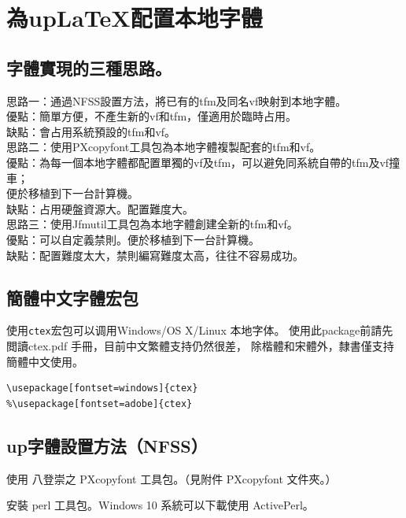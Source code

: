 \clearpage

\section{為up{\LaTeX}配置本地字體}

\subsection{字體實現的三種思路。}
\par\noindent
思路一：通過NFSS設置方法，將已有的tfm及同名vf映射到本地字體。\\
優點：簡單方便，不產生新的vf和tfm，僅適用於臨時占用。\\
缺點：會占用系統預設的tfm和vf。\\[5mm]
思路二：使用PXcopyfont工具包為本地字體複製配套的tfm和vf。\\
優點：為每一個本地字體都配置單獨的vf及tfm，可以避免同系統自帶的tfm及vf撞車；\\
\hspace{3zw}便於移植到下一台計算機。\\
缺點：占用硬盤資源大。配置難度大。\\[5mm]
思路三：使用Jfmutil工具包為本地字體創建全新的tfm和vf。\\
優點：可以自定義禁則。便於移植到下一台計算機。\\
缺點：配置難度太大，禁則編寫難度太高，往往不容易成功。


\subsection{簡體中文字體宏包}
\par
使用\verb+ctex+宏包可以调用Windows/OS X/Linux 本地字体。
使用此package前請先閲讀ctex.pdf 手冊，目前中文繁體支持仍然很差，
除楷體和宋體外，隸書僅支持簡體中文使用。
\begin{lstlisting}[firstnumber=1]
\usepackage[fontset=windows]{ctex}
%\usepackage[fontset=adobe]{ctex}
\end{lstlisting}


\subsection{{up\LaTeXe}字體設置方法（NFSS）}

\par{}使用 八登崇之 PXcopyfont 工具包。（見附件 PXcopyfont 文件夾。）
\par{}安裝 perl 工具包。Windows 10 系統可以下載使用 {ActivePerl}。

